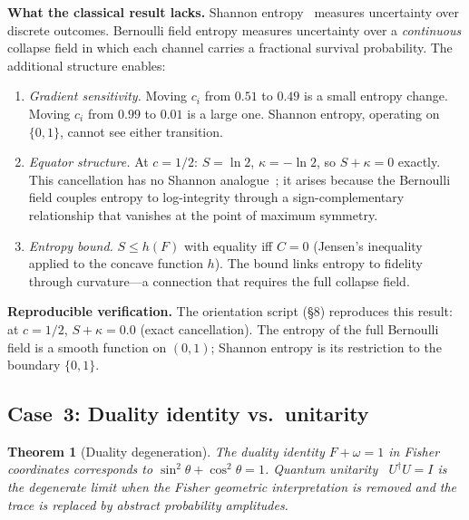 \documentclass[
  aps,
  prd,
  twocolumn,
  superscriptaddress,
  nofootinbib,
  floatfix
]{revtex4-2}
\newtheorem{theorem}{Theorem}
\begin{document}
\noindent\textbf{What the classical result lacks.}
Shannon entropy~\cite{shannon1948,cover2006elements} measures
uncertainty over discrete outcomes.  Bernoulli field entropy
measures uncertainty over a \emph{continuous} collapse field
in which each channel carries a fractional survival probability.
The additional structure enables:
\begin{enumerate}[leftmargin=*,label=(\alph*)]
\item \emph{Gradient sensitivity.}  Moving $c_i$ from $0.51$
  to $0.49$ is a small entropy change.  Moving $c_i$ from
  $0.99$ to $0.01$ is a large one.  Shannon entropy, operating
  on $\{0,1\}$, cannot see either transition.
\item \emph{Equator structure.}  At $c = 1/2$:
  $S = \ln 2$, $\kappa = -\ln 2$, so $S + \kappa = 0$ exactly.
  This cancellation has no Shannon analogue~\cite{shannon1948};
  it arises because the Bernoulli field couples entropy to
  log-integrity through a sign-complementary relationship that
  vanishes at the point of maximum symmetry.
\item \emph{Entropy bound.}  $S \leq h(F)$ with equality iff
  $C = 0$ (Jensen's inequality applied to the concave function
  $h$).  The bound links entropy to fidelity through curvature---a
  connection that requires the full collapse field.
\end{enumerate}

\noindent\textbf{Reproducible verification.}
The orientation script (\S8) reproduces this result: at
$c = 1/2$, $S + \kappa = 0.0$ (exact cancellation).  The
entropy of the full Bernoulli field is a smooth function on
$(0,1)$; Shannon entropy is its restriction to the boundary
$\{0,1\}$.

\subsection{Case~3: Duality identity vs.\ unitarity}

\begin{theorem}[Duality degeneration]
\label{thm:duality_deg}
The duality identity $F + \omega = 1$ in Fisher coordinates
corresponds to $\sin^2\theta + \cos^2\theta = 1$.
Quantum unitarity~\cite{dirac1930principles,vonforthcoming,weinberg1995qft1}
$U^\dagger U = I$ is the degenerate limit when the Fisher
geometric interpretation is removed and the trace is replaced
by abstract probability amplitudes.
\end{theorem}
\end{document}
